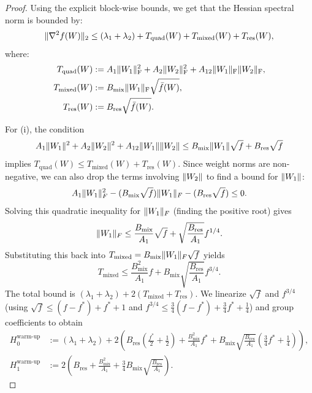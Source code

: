 \documentclass[a4paper,11pt]{article}
\DeclarePairedDelimiter{\norm}{\|}{\|}
\newcommand{\1}{\mathbbm{1}}
\theoremstyle{plain}
\begin{document}
\begin{proof}
Using the explicit block-wise bounds, we get that the Hessian spectral norm is bounded by:
\begin{equation*}
\label{eq:exact_decomp_ce}
    \norm{\nabla^2 f(W)}_2 \le (\lambda_1 + \lambda_2) + T_{\text{quad}}(W) + T_{\text{mixed}}(W) + T_{\text{res}}(W),
\end{equation*}
where:
\begin{align*}
    T_{\text{quad}}(W) &:= A_1 \norm{W_1}_{\mathrm F}^2 + A_2 \norm{W_2}_{\mathrm F}^2 + A_{12} \norm{W_1}_{\mathrm F} \norm{W_2}_{\mathrm F}, \\
    T_{\text{mixed}}(W) &:= B_{\text{mix}} \norm{W_1}_{\mathrm F} \sqrt{\bar{f}(W)}, \\
    T_{\text{res}}(W) &:= B_{\text{res}} \sqrt{\bar{f}(W)}.
\end{align*}

For (i), the condition
\begin{equation}
\label{eq:cross_entropy_local_condition}
    A_1 \norm{W_1}^2 + A_2 \norm{W_2}^2 + A_{12} \norm{W_1}\norm{W_2} \le  B_{\text{mix}} \norm{W_1} \sqrt{f} + B_{\text{res}} \sqrt{f}
\end{equation}
implies $T_{\text{quad}}(W) \leq T_{\text{mixed}}(W) + T_{\text{res}}(W)$.
Since weight norms are non-negative, we can also drop the terms involving $\norm{W_2}$ to find a bound for $\norm{W_1}$:
\begin{equation*}
    A_1 \norm{W_1}_F^2 - ( B_{\text{mix}} \sqrt{f}) \norm{W_1}_F - ( B_{\text{res}} \sqrt{f}) \le 0.
\end{equation*}
Solving this quadratic inequality for $\norm{W_1}_F$ (finding the positive root) gives
\begin{equation*}
    \norm{W_1}_F \le \frac{ B_{\text{mix}}}{A_1} \sqrt{f} + \sqrt{\frac{ B_{\text{res}}}{A_1}} f^{1/4}.
\end{equation*}
Substituting this back into $T_{\text{mixed}} = B_{\text{mix}} \norm{W_1}_F \sqrt{f}$ yields
\begin{equation*}
    T_{\text{mixed}} \le \frac{ B_{\text{mix}}^2}{A_1} f + B_{\text{mix}}\sqrt{\frac{ B_{\text{res}}}{A_1}} f^{3/4}.
\end{equation*}
The total bound is $(\lambda_1+\lambda_2) + 2 (T_{\text{mixed}} + T_{\text{res}})$.
We linearize $\sqrt{f}$ and $f^{3/4}$ (using $\sqrt{f} \leq (f-f^*)+f^*+1$ and $f^{3/4} \le \frac{3}{4}(f-f^*) +\frac{3}{4} f^* + \frac{1}{4}$) and group coefficients to obtain
\begin{align}
\label{eq:warmup_cross_entropy}
H_0^{\text{warm-up}} &:= (\lambda_1 + \lambda_2) + 2 \left( B_{\text{res}}\left(\frac{f^*}{2} + \frac{1}{2}\right) + \frac{ B_{\text{mix}}^2}{A_1}f^* + B_{\text{mix}}\sqrt{\frac{ B_{\text{res}}}{A_1}} \left(\frac{3}{4}f^* + \frac{1}{4}\right) \right), \nonumber \\ 
    H_1^{\text{warm-up}} &:= 2 \left( B_{\text{res}} + \frac{ B_{\text{mix}}^2}{A_1} + \frac{3}{4} B_{\text{mix}}\sqrt{\frac{ B_{\text{res}}}{A_1}} \right).
\end{align}


\end{proof}
\end{document}
